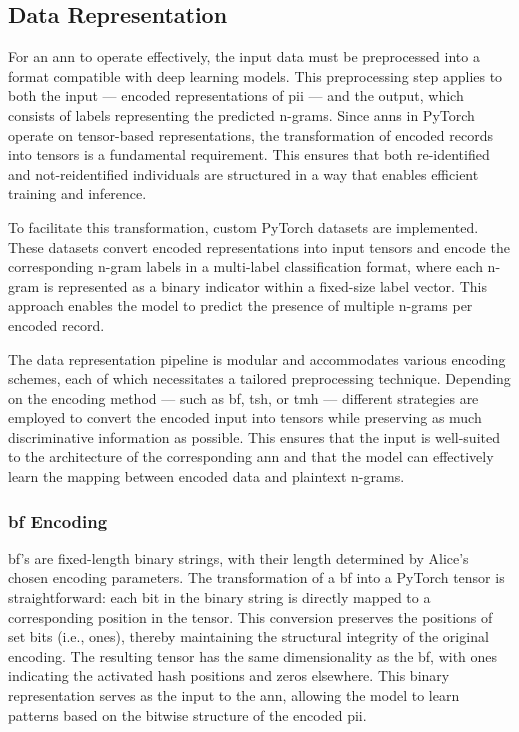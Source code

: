 \subsection{Data Representation} \label{sec:representation}

For an \ac{ann} to operate effectively, the input data must be preprocessed into a format compatible with deep learning models.
This preprocessing step applies to both the input — encoded representations of \ac{pii} — and the output, which consists of labels representing the predicted n-grams.
Since \ac{ann}s in PyTorch operate on tensor-based representations, the transformation of encoded records into tensors is a fundamental requirement.
This ensures that both re-identified and not-reidentified individuals are structured in a way that enables efficient training and inference.

To facilitate this transformation, custom PyTorch datasets are implemented.
These datasets convert encoded representations into input tensors and encode the corresponding n-gram labels in a multi-label classification format, where each n-gram is represented as a binary indicator within a fixed-size label vector.
This approach enables the model to predict the presence of multiple n-grams per encoded record.

The data representation pipeline is modular and accommodates various encoding schemes, each of which necessitates a tailored preprocessing technique.
Depending on the encoding method — such as \ac{bf}, \ac{tsh}, or \ac{tmh} — different strategies are employed to convert the encoded input into tensors while preserving as much discriminative information as possible.
This ensures that the input is well-suited to the architecture of the corresponding \ac{ann} and that the model can effectively learn the mapping between encoded data and plaintext n-grams.

\subsubsection{\ac{bf} Encoding}

\ac{bf}'s are fixed-length binary strings, with their length determined by Alice’s chosen encoding parameters.
The transformation of a \ac{bf} into a PyTorch tensor is straightforward: each bit in the binary string is directly mapped to a corresponding position in the tensor.
This conversion preserves the positions of set bits (i.e., ones), thereby maintaining the structural integrity of the original encoding.
The resulting tensor has the same dimensionality as the \ac{bf}, with ones indicating the activated hash positions and zeros elsewhere.
This binary representation serves as the input to the \ac{ann}, allowing the model to learn patterns based on the bitwise structure of the encoded \ac{pii}.

